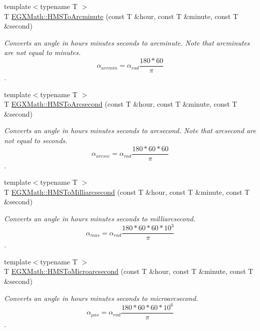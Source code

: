\begin{DoxyCompactItemize}
{\footnotesize template$<$typename T $>$ }\\T \mbox{\hyperlink{group___e_g_x_math-_angle_conversions-_h_m_s_ga36fcb6a59fd8d135346f7ee3d648c2f4}{E\+G\+X\+Math\+::\+H\+M\+S\+To\+Arcminute}} (const T \&hour, const T \&minute, const T \&second)
\begin{DoxyCompactList}\small\item\em Converts an angle in hours minutes seconds to arcminute. Note that arcminutes are not equal to minutes. \[\alpha_{arcmin}=\alpha_{rad}\frac{180 * 60}{\pi}\]. \end{DoxyCompactList}\item 
{\footnotesize template$<$typename T $>$ }\\T \mbox{\hyperlink{group___e_g_x_math-_angle_conversions-_h_m_s_ga0eb401fd061fcc28ed22ddc869938bea}{E\+G\+X\+Math\+::\+H\+M\+S\+To\+Arcsecond}} (const T \&hour, const T \&minute, const T \&second)
\begin{DoxyCompactList}\small\item\em Converts an angle in hours minutes seconds to arcsecond. Note that arcsecond are not equal to seconds. \[\alpha_{arcsec}=\alpha_{rad}\frac{180 * 60 * 60}{\pi}\]. \end{DoxyCompactList}\item 
{\footnotesize template$<$typename T $>$ }\\T \mbox{\hyperlink{group___e_g_x_math-_angle_conversions-_h_m_s_ga08189ea113f78c71e3d30055c757604a}{E\+G\+X\+Math\+::\+H\+M\+S\+To\+Milliarcsecond}} (const T \&hour, const T \&minute, const T \&second)
\begin{DoxyCompactList}\small\item\em Converts an angle in hours minutes seconds to milliarcsecond. \[\alpha_{mas}=\alpha_{rad}\frac{180 * 60 * 60 * 10^3}{\pi}\]. \end{DoxyCompactList}\item 
{\footnotesize template$<$typename T $>$ }\\T \mbox{\hyperlink{group___e_g_x_math-_angle_conversions-_h_m_s_ga5d91ade4a1aaf641f9483e840e701446}{E\+G\+X\+Math\+::\+H\+M\+S\+To\+Microarcsecond}} (const T \&hour, const T \&minute, const T \&second)
\begin{DoxyCompactList}\small\item\em Converts an angle in hours minutes seconds to microarcsecond. \[\alpha_{\mu as}=\alpha_{rad}\frac{180 * 60 * 60 * 10^6}{\pi}\]. \end{DoxyCompactList}\item 

\end{DoxyCompactItemize}

